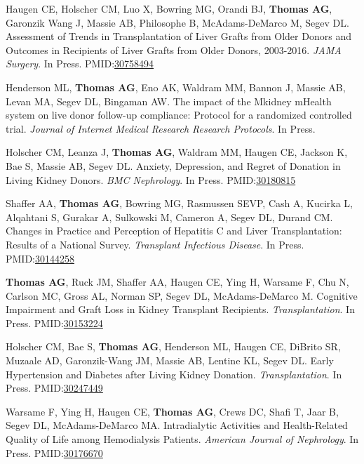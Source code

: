 \documentclass[10pt]{article}
\makeatletter
\newlength{\bibhang}
\newlength{\bibsep}
 {\@listi \global\bibsep\itemsep \global\advance\bibsep by\parsep}
\newenvironment{bibenum*}
  {\renewcommand\labelenumi{[\theenumi]}%
   \etaremune[
     topsep=0pt,
     itemsep=\bibsep,
     parsep=0pt,partopsep=0pt,
     itemindent=-\bibhang,
     leftmargin={\bibhang+\widthof{[999]}}]}
  {\endetaremune}
\newcommand{\pmid}[1]{PMID:\href{https://www.ncbi.nlm.nih.gov/pubmed/#1}{#1}}
\makeatother
\begin{document}
\begin{bibenum*}
\item Haugen CE, Holscher CM, Luo X, Bowring MG, Orandi BJ, \textbf{Thomas AG},
  Garonzik Wang J, Massie AB, Philosophe B, McAdams-DeMarco M, Segev DL.
  Assessment of Trends in Transplantation of Liver Grafts from Older Donors
  and Outcomes in Recipients of Liver Grafts from Older Donors, 2003-2016.
  \emph{JAMA Surgery}. In Press.
  \pmid{30758494} 

\item Henderson ML, \textbf{Thomas AG}, Eno AK, Waldram MM, Bannon J,
  Massie AB, Levan MA, Segev DL, Bingaman AW.
  The impact of the Mkidney mHealth system on live donor
  follow-up compliance: Protocol for a randomized controlled trial.
  \emph{Journal of Internet Medical Research Research Protocols}. In Press.

\item Holscher CM, Leanza J, \textbf{Thomas AG}, Waldram MM, Haugen CE,
  Jackson K, Bae S, Massie AB, Segev DL. Anxiety, Depression, and
  Regret of Donation in Living Kidney Donors.
  \emph{BMC Nephrology}. In Press.
  \pmid{30180815} 

\item Shaffer AA, \textbf{Thomas AG}, Bowring MG, Rasmussen SEVP,
  Cash A, Kucirka L, Alqahtani S, Gurakar A, Sulkowski M, Cameron A,
  Segev DL, Durand CM. Changes in Practice and Perception of Hepatitis
  C and Liver Transplantation: Results of a National Survey.
  \emph{Transplant Infectious Disease}. In Press.
  \pmid{30144258} 

\item \textbf{Thomas AG\dag}, Ruck JM\dag, Shaffer AA, Haugen CE, Ying H,
  Warsame F, Chu N, Carlson MC, Gross AL,
  Norman SP, Segev DL, McAdams-DeMarco M.
  Cognitive Impairment and Graft Loss in Kidney Transplant Recipients.
  \emph{Transplantation}. In Press.
  \pmid{30153224} 

\item Holscher CM, Bae S, \textbf{Thomas AG}, Henderson ML, Haugen CE,
  DiBrito SR, Muzaale AD, Garonzik-Wang JM, Massie AB, Lentine KL, Segev DL.
  Early Hypertension and Diabetes after Living Kidney Donation.
  \emph{Transplantation}. In Press.
  \pmid{30247449} 

\item Warsame F, Ying H, Haugen CE, \textbf{Thomas AG}, Crews DC, Shafi T,
  Jaar B, Segev DL, McAdams-DeMarco MA. Intradialytic Activities and
  Health-Related Quality of Life among Hemodialysis Patients.
  \emph{American Journal of Nephrology}. In Press.
  \pmid{30176670} 


\end{bibenum*}
\end{document}
